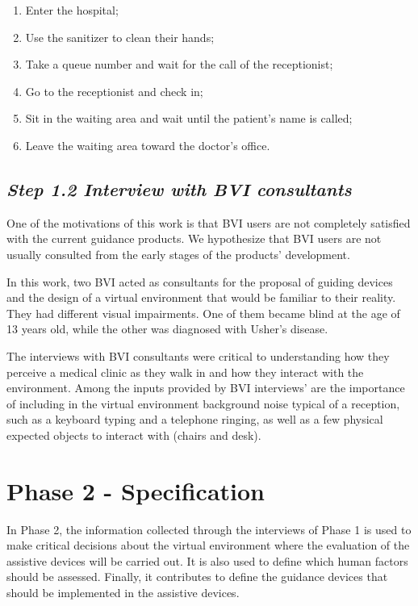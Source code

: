         \begin{enumerate}
            \item Enter the hospital;
            \item Use the sanitizer to clean their hands;
            \item Take a queue number and wait for the call of the receptionist;
            \item Go to the receptionist and check in;
            \item Sit in the waiting area and wait until the patient's name is called;
            \item Leave the waiting area toward the doctor's office.            
        \end{enumerate}


    \subsection*{\textit{Step 1.2 Interview with BVI consultants}}
    
        One of the motivations of this work is that BVI users are not completely satisfied with the current guidance products. We hypothesize that BVI users are not usually consulted from the early stages of the products' development.

        In this work, two BVI acted as consultants for the proposal of guiding devices and the design of a virtual environment that would be familiar to their reality. They had different visual impairments. One of them became blind at the age of 13 years old, while the other was diagnosed with Usher's disease. 

        The interviews with BVI consultants were critical to understanding how they perceive a medical clinic as they walk in and how they interact with the environment. Among the inputs provided by BVI interviews' are the importance of including in the virtual environment background noise typical of a reception, such as a keyboard typing and a telephone ringing, as well as a few physical expected objects to interact with (chairs and desk).
    

\section{Phase 2 - Specification}
\label{sec:idealization_phase}
    In Phase 2, the information collected through the interviews of Phase 1 is used to make critical decisions about the virtual environment where the evaluation of the assistive devices will be carried out. It is also used to define which human factors should be assessed. Finally, it contributes to define the guidance devices that should be implemented in the assistive devices.
    

